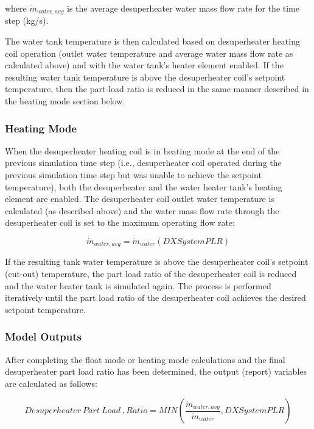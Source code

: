 where \(\dot{m}_{water,avg}\) is the average desuperheater water mass flow rate for the time step (kg/s).

The water tank temperature is then calculated based on desuperheater heating coil operation (outlet water temperature and average water mass flow rate as calculated above) and with the water tank's heater element enabled. If the resulting water tank temperature is above the desuperheater coil's setpoint temperature, then the part-load ratio is reduced in the same manner described in the heating mode section below.

\subsubsection{Heating Mode}\label{heating-mode}

When the desuperheater heating coil is in heating mode at the end of the previous simulation time step (i.e., desuperheater coil operated during the previous simulation time step but was unable to achieve the setpoint temperature), both the desuperheater and the water heater tank's heating element are enabled. The desuperheater coil outlet water temperature is calculated (as described above) and the water mass flow rate through the desuperheater coil is set to the maximum operating flow rate:

\begin{equation}
\dot{m}_{water,avg} = \dot{m}_{water} \left( {DXSystemPLR} \right)
\end{equation}

If the resulting tank water temperature is above the desuperheater coil's setpoint (cut-out) temperature, the part load ratio of the desuperheater coil is reduced and the water heater tank is simulated again. The process is performed iteratively until the part load ratio of the desuperheater coil achieves the desired setpoint temperature.

\subsubsection{Model Outputs}\label{model-outputs}

After completing the float mode or heating mode calculations and the final desuperheater part load ratio has been determined, the output (report) variables are calculated as follows:

\begin{equation}
Desuperheater~Part~Load~,Ratio = MIN\left( {\frac{{\dot{m}_{water,avg}}}{{\dot{m}_{water}}},DXSystemPLR} \right)
\end{equation}

